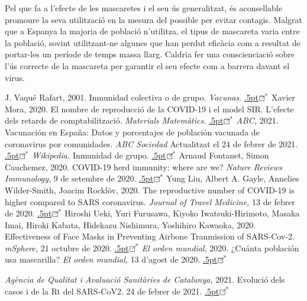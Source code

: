 \documentclass[11pt,a4paper]{article}
\newcommand\enllas{\raise.5pt\hbox{$\boxempty\kern-4.85pt{}^{\tiny\nearrow}$}\kern-2pt}
\begin{document}
	Pel que fa a l'efecte de les mascaretes i el seu ús generalitzat, és aconsellable promoure la seva utilització en la mesura del possible per evitar contagis. Malgrat que a Espanya la majoria de població n'utilitza, el tipus de mascareta varia entre la població, sovint utilitzant-ne algunes que han perdut eficàcia com a resultat de portar-les un període de temps massa llarg. Caldria fer una conscienciació sobre l'ús correcte de la mascareta per garantir el seu efecte com a barrera davant el virus.
	\begin{thebibliography}{10}
		 J. Vaqué Rafart, 2001. Inmunidad colectiva o de grupo. \textit{Vacunas}.
		\href{https://www.elsevier.es/index.php?p=revista&pRevista=pdf-simple&pii=S1576988701702294&r=28}{\enllas}
		Xavier Mora, 2020. El nombre de reproducció de la COVID-19 i el model SIR. L'efecte dels retards de comptabilització. \textit{Materials Matemàtics.} 
		\href{https://mat.uab.cat/web/matmat/wp-content/uploads/sites/23/2020/06/v2020n02.pdf}{\enllas}
		 \textsl{ABC,} 2021. Vacunación en España: Datos y porcentajes de población vacunada de coronavirus por comunidades. \textit{ABC Sociedad} Actualitzat el 24 de febrer de 2021.
		\href{https://www.abc.es/sociedad/abci-vacunacion-espana-vacunas-coronavirus-datos-nsv-202102171044_noticia.html}{\enllas}
		 \textsl{Wikipedia.} Inmunidad de grupo.
		\href{https://es.wikipedia.org/wiki/Inmunidad_de_grupo}{\enllas}
		 Arnaud Fontanet, Simon Cauchemez, 2020. COVID-19 herd immunity: where are we? \textit{Nature Reviews Immunology}, 9 de setembre de 2020.
		\href{https://www.nature.com/articles/s41577-020-00451-5.pdf#page2}{\enllas}
		 Yung Liu, Albert A. Gayle, Annelies Wilder-Smith, Joacim Rocklöv, 2020. The reproductive number of COVID-19 is higher compared to SARS coronavirus. \textit{Journal of Travel Medicine,} 13 de febrer de 2020.
		\href{https://academic.oup.com/jtm/article/27/2/taaa021/5735319}{\enllas}
		 Hiroshi Ueki, Yuri Furusawa, Kiyoko Iwatsuki-Hirimoto, Masaka Imai, Hiroki Kabata, Hidekazu Nishimura, Yoshihiro Kawaoka, 2020. Effectiveness of Face Masks in Preventing Airbone Tranmission of SARS-Cov-2. \textit{mSphere,} 21 octubre de 2020.
		\href{https://msphere.asm.org/content/msph/5/5/e00637-20.full.pdf?fbclid=IwAR3am9VXHcehGEADz00IrTSAd0yLJ_b0hmD54zXfaFsBz52JZhY1xnjUDm8}{\enllas}
		 \textsl{El orden mundial}, 2020. ¿Cuánta población usa mascarilla? \textit{El orden mundial,} 13 d'agost de 2020.
		\href{https://elordenmundial.com/mapas/uso-mascarilla-mundo/}{\enllas}
		
		 \textsl{Agència de Qualitat i Avaluació Sanitàries de Catalunya,} 2021. Evolució dels casos i de la Rt del SARS-CoV2. 24 de febrer de 2021. \href{https://aquas.gencat.cat/ca/actualitat/ultimes-dades-coronavirus}{\enllas}
	\end{thebibliography}
\end{document}
